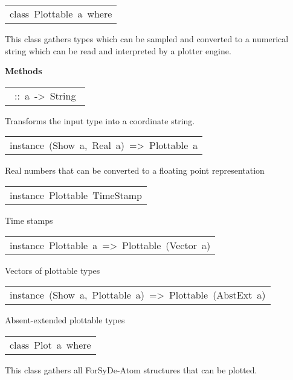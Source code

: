 \begin{haddockdesc}
\item[\begin{tabular}{@{}l}
class\ Plottable\ a\ where
\end{tabular}]\haddockbegindoc
This class gathers types which can be sampled and converted to a
 numerical string which can be read and interpreted by a plotter
 engine.\par

\haddockpremethods{}\textbf{Methods}
\begin{haddockdesc}
\item[\begin{tabular}{@{}l}\haddockid{toCoord}\ ::\ a\ ->\ String\ \end{tabular}]
\haddockbegindoc
Transforms the input type into a coordinate string.\par

\end{haddockdesc}


\item[\begin{tabular}{@{}l}
instance\ (Show\ a,\ Real\ a)\ =>\ Plottable\ a
\end{tabular}]\haddockbegindoc
Real numbers that can be converted to a floating point representation\par


\item[\begin{tabular}{@{}l}
instance\ Plottable\ TimeStamp
\end{tabular}]\haddockbegindoc
Time stamps\par


\item[\begin{tabular}{@{}l}
instance\ Plottable\ a\ =>\ Plottable\ (Vector\ a)
\end{tabular}]\haddockbegindoc
Vectors of plottable types\par


\item[\begin{tabular}{@{}l}
instance\ (Show\ a,\ Plottable\ a)\ =>\ Plottable\ (AbstExt\ a)
\end{tabular}]\haddockbegindoc
Absent-extended plottable types\par


\item[\begin{tabular}{@{}l}
class\ Plot\ a\ where
\end{tabular}]\haddockbegindoc
This class gathers all ForSyDe-Atom structures that can be
 plotted.\par


\end{haddockdesc}
